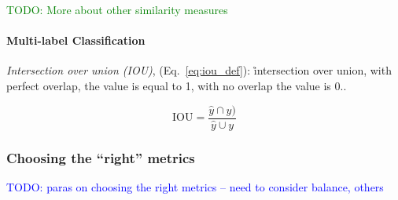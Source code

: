 \textcolor{green}{TODO: More about other similarity measures}




\paragraph{Multi-label Classification}

\textit{Intersection over union (IOU)}, (Eq.~\ref{eq:iou_def}): \r{intersection over union, with perfect overlap, the value is equal to 1, with no overlap the value is 0.}.


\begin{equation}
	{\textrm{IOU} = \frac{\hat{y} \cap y)}{\hat{y} \cup y}}
	\label{eq:iou_def}
\end{equation}









\subsubsection{Choosing the ``right'' metrics}

\textcolor{blue}{TODO: paras on choosing the right metrics -- need to consider balance, others}



